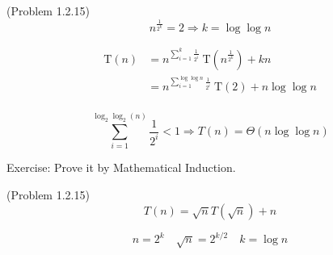 \begin{frame}{(Problem 1.2.15)}
  \[
	n^{\frac{1}{2^k}} = 2 \Rightarrow k = \log\log n
  \]

  \pause

  \begin{align*} 
	\text{T}(n) &= n^{\sum_{i=1}^{k}\frac{1}{2^i}}\ \text{T}\left(n^{\frac{1}{2^k}}\right ) +kn\\ 
		&=n^{\sum_{i=1}^{\log\log n}\frac{1}{2^i}}\ \text{T}(2) + n \log\log n\\ 
  \end{align*}

  \pause
  \[
	\sum_{i=1}^{\log_2\log_2(n)}\frac{1}{2^i} < 1 \Rightarrow T(n) = \Theta(n \log \log n)
  \]

  \pause
  \vspace{0.30cm}
  \centerline{Exercise: Prove it by Mathematical Induction.}
\end{frame}
\begin{frame}{(Problem 1.2.15)}
  \[
	T(n) = \sqrt{n} T(\sqrt{n}) + n
  \]

  \[
	n = 2^k \quad \sqrt{n} = 2^{k/2} \quad k = \log n
  \]
\end{frame}
